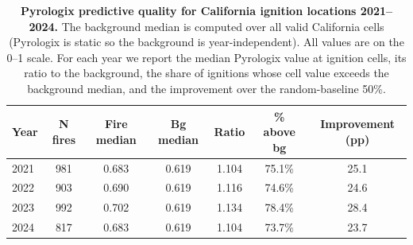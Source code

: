 \begin{table}[!t]
\caption{\textbf{Pyrologix predictive quality for California ignition locations 2021--2024.} The background median is computed over all valid California cells (Pyrologix is static so the background is year-independent). All values are on the 0--1 scale. For each year we report the median Pyrologix value at ignition cells, its ratio to the background, the share of ignitions whose cell value exceeds the background median, and the improvement over the random-baseline 50\%.}
\label{tab:pyrologix_quality}
{\small
\begin{tabular}{@{}lcccccc@{}}
\toprule
\textbf{Year} & \textbf{N fires} & \textbf{Fire median} & \textbf{Bg median} & \textbf{Ratio} & \textbf{\% above bg} & \textbf{Improvement (pp)} \\
\midrule
2021 & 981 & 0.683 & 0.619 & 1.104 & 75.1\% & 25.1 \\
2022 & 903 & 0.690 & 0.619 & 1.116 & 74.6\% & 24.6 \\
2023 & 992 & 0.702 & 0.619 & 1.134 & 78.4\% & 28.4 \\
2024 & 817 & 0.683 & 0.619 & 1.104 & 73.7\% & 23.7 \\
\bottomrule
\end{tabular}
}
\end{table}
